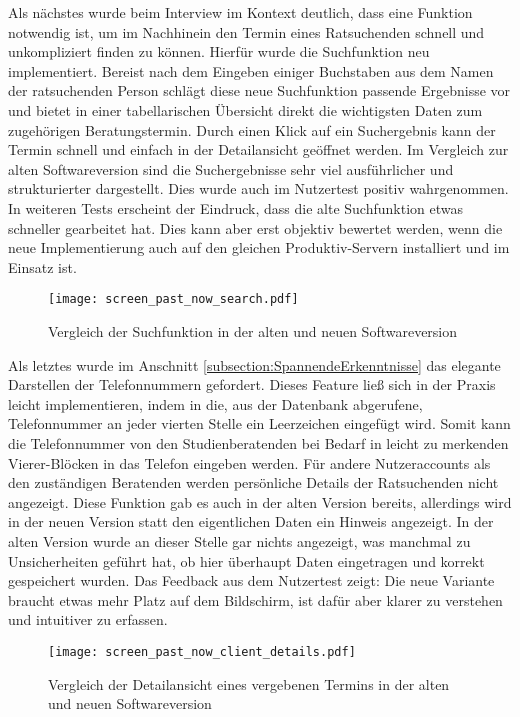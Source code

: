 Als nächstes wurde beim Interview im Kontext deutlich, dass eine Funktion
notwendig ist, um im Nachhinein den Termin eines Ratsuchenden schnell und
unkompliziert finden zu können. Hierfür wurde die Suchfunktion neu
implementiert. Bereist nach dem Eingeben einiger Buchstaben aus dem Namen der
ratsuchenden Person schlägt diese neue Suchfunktion passende Ergebnisse vor und
bietet in einer tabellarischen Übersicht direkt die wichtigsten Daten zum
zugehörigen Beratungstermin. Durch einen Klick auf ein Suchergebnis kann der
Termin schnell und einfach in der Detailansicht geöffnet werden. Im Vergleich
zur alten Softwareversion sind die Suchergebnisse sehr viel ausführlicher und
strukturierter dargestellt. Dies wurde auch im Nutzertest positiv wahrgenommen.
In weiteren Tests erscheint der Eindruck, dass die alte Suchfunktion etwas
schneller gearbeitet hat. Dies kann aber erst objektiv bewertet werden, wenn
die neue Implementierung auch auf den gleichen Produktiv-Servern installiert
und im Einsatz ist.

\begin{figure}[H]
    \caption{Vergleich der Suchfunktion in der alten und neuen Softwareversion}
    \centering
    \texttt{[image: screen\_past\_now\_search.pdf]}
\end{figure}

Als letztes wurde im Anschnitt \ref{subsection:SpannendeErkenntnisse} das
elegante Darstellen der Telefonnummern gefordert. Dieses Feature ließ sich in
der Praxis leicht implementieren, indem in die, aus der Datenbank abgerufene,
Telefonnummer an jeder vierten Stelle ein Leerzeichen eingefügt wird. Somit
kann die Telefonnummer von den Studienberatenden bei Bedarf in leicht zu
merkenden Vierer-Blöcken in das Telefon eingeben werden. Für andere
Nutzeraccounts als den zuständigen Beratenden werden persönliche Details der
Ratsuchenden nicht angezeigt. Diese Funktion gab es auch in der alten Version
bereits, allerdings wird in der neuen Version statt den eigentlichen Daten ein
Hinweis angezeigt. In der alten Version wurde an dieser Stelle gar nichts
angezeigt, was manchmal zu Unsicherheiten geführt hat, ob hier überhaupt Daten
eingetragen und korrekt gespeichert wurden. Das Feedback aus dem Nutzertest
zeigt: Die neue Variante braucht etwas mehr Platz auf dem Bildschirm, ist dafür
aber klarer zu verstehen und intuitiver zu erfassen.

\begin{figure}[H]
    \caption{Vergleich der Detailansicht eines vergebenen Termins in der alten und neuen Softwareversion}
    \centering
    \texttt{[image: screen\_past\_now\_client\_details.pdf]}
\end{figure}

